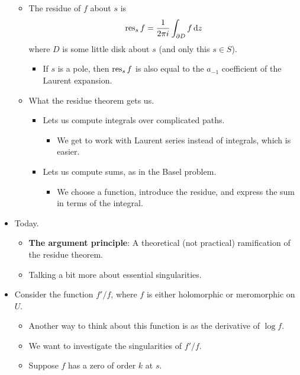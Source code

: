 \documentclass[../notes.tex]{subfiles}
\begin{document}
\begin{itemize}
\begin{itemize}
        \item The residue of $f$ about $s$ is
        \begin{equation*}
            \operatorname{res}_sf = \frac{1}{2\pi i}\int_{\partial D}f\dd{z}
        \end{equation*}
        where $D$ is some little disk about $s$ (and only this $s\in S$).
        \begin{itemize}
            \item If $s$ is a pole, then $\operatorname{res}_sf$ is also equal to the $a_{-1}$ coefficient of the Laurent expansion.
        \end{itemize}
        \item What the residue theorem gets us.
        \begin{itemize}
            \item Lets us compute integrals over complicated paths.
            \begin{itemize}
                \item We get to work with Laurent series instead of integrals, which is easier.
            \end{itemize}
            \item Lets us compute sums, as in the Basel problem.
            \begin{itemize}
                \item We choose a function, introduce the residue, and express the sum in terms of the integral.
            \end{itemize}
        \end{itemize}
    \end{itemize}
    \item Today.
    \begin{itemize}
        \item \textbf{The argument principle}: A theoretical (not practical) ramification of the residue theorem.
        \item Talking a bit more about essential singularities.
    \end{itemize}
    \item Consider the function $f'/f$, where $f$ is either holomorphic or meromorphic on $U$.
    \begin{itemize}
        \item Another way to think about this function is as the derivative of $\log f$.
        \item We want to investigate the singularities of $f'/f$.
        \item Suppose $f$ has a zero of order $k$ at $s$.

\end{itemize}
\end{itemize}
\end{document}
